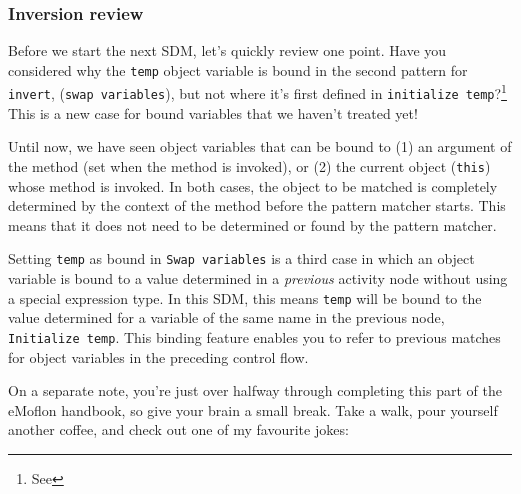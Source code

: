 \newpage
\subsubsection{Inversion review}
\genHeader
\hypertarget{invert close}{}

Before we start the next SDM, let's quickly review one point. Have you considered why the \texttt{temp} object variable is bound in the second pattern for
\texttt{invert}, (\texttt{swap variables}), but not where it's first defined in \texttt{initialize temp}?\footnote{See } This is a new case for bound variables that we haven't treated yet!

Until now, we have seen object variables that can be bound to (1) an argument of the method (set when the method is invoked), or (2) the
current object (\texttt{this}) whose method is invoked. In both cases, the object to be matched is completely determined by the context of the method before
the pattern matcher starts. This means that it does not need to be determined or found by the pattern matcher.

Setting \texttt{temp} as bound in \texttt{Swap variables} is a third case in which an object variable is bound to a value determined in a \emph{previous}
activity node without using a special expression type. In this SDM, this means \texttt{temp} will be bound to the value determined for a variable
of the same name in the previous node, \texttt{Initialize temp}. This binding feature enables you to refer to previous matches for object variables in the
preceding control flow.

On a separate note, you're just over halfway through completing this part of the eMoflon handbook, so give your brain a small break. Take a walk, pour
yourself another coffee, and check out one of my favourite jokes:

\vspace{0.5cm}

